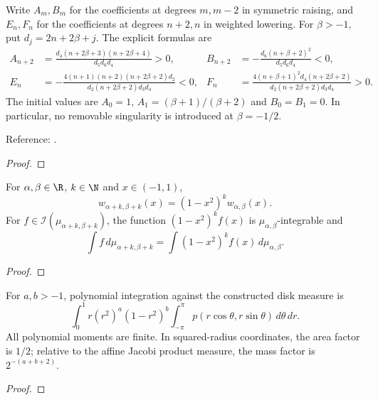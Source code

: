 \begin{supporting}
\begin{theorem}
\label{thm:jacobi-symmetric-coefficients}
\leanok
Write $A_m,B_m$ for the coefficients at degrees $m,m-2$ in symmetric raising,
and $E_n,F_n$ for the coefficients at degrees $n+2,n$ in weighted lowering.
For $\beta>-1$, put $d_j=2n+2\beta+j$. The explicit formulas are
\begin{align*}
 A_{n+2}&=\frac{d_4(n+2\beta+3)(n+2\beta+4)}{d_5d_6d_4}>0,&
 B_{n+2}&=-\frac{d_6(n+\beta+2)^2}{d_5d_6d_4}<0,\\
 E_n&=-\frac{4(n+1)(n+2)(n+2\beta+2)d_2}{d_2(n+2\beta+2)d_3d_4}<0,&
 F_n&=\frac{4(n+\beta+1)^2d_4(n+2\beta+2)}{d_2(n+2\beta+2)d_3d_4}>0.
\end{align*}
The initial values are $A_0=1$, $A_1=(\beta+1)/(\beta+2)$ and $B_0=B_1=0$.
In particular, no removable singularity is introduced at $\beta=-1/2$.

Reference: \cite[18.9(ii)]{dlmf}.
\end{theorem}
\begin{proof}
\leanok
\end{proof}

\begin{theorem}
\label{thm:jacobi-symmetric-measure-shift}

\leanok
For $\alpha,\beta\in\R$, $k\in\N$ and $x\in(-1,1)$,
\[w_{\alpha+k,\beta+k}(x)=(1-x^2)^k w_{\alpha,\beta}(x).\]
For $f\in\mathcal I(\mu_{\alpha+k,\beta+k})$, the function $(1-x^2)^kf(x)$ is $\mu_{\alpha,\beta}$-integrable and
\[\int f\,d\mu_{\alpha+k,\beta+k}=\int (1-x^2)^kf(x)\,d\mu_{\alpha,\beta}.\]
\end{theorem}
\begin{proof}
\leanok
\end{proof}

\begin{theorem}
\label{thm:zernike-disk-measure}
\leanok
For $a,b>-1$, polynomial integration against the constructed disk measure is
\[
 \int_0^1 r(r^2)^a(1-r^2)^b
   \int_{-\pi}^{\pi}p(r\cos\theta,r\sin\theta)\,d\theta\,dr.
\]
All polynomial moments are finite. In squared-radius coordinates, the area
factor is $1/2$; relative to the affine Jacobi product measure, the mass factor
is $2^{-(a+b+2)}$.
\end{theorem}
\begin{proof}
\leanok
\end{proof}


\end{supporting}
